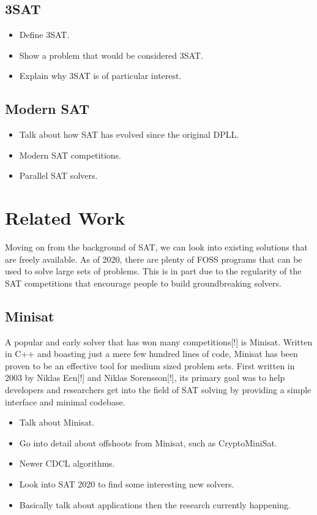 \documentclass{article}
\begin{document}
\subsection{3SAT}
\begin{itemize}
    \item Define 3SAT.
    \item Show a problem that would be considered 3SAT.
    \item Explain why 3SAT is of particular interest.
\end{itemize}

\subsection{Modern SAT}
\begin{itemize}
    \item Talk about how SAT has evolved since the original DPLL.
    \item Modern SAT competitions.
    \item Parallel SAT solvers.
\end{itemize}

\section{Related Work}
Moving on from the background of SAT, we can look into existing solutions that are freely available.
As of 2020, there are plenty of FOSS programs that can be used to solve large sets of problems. This
is in part due to the regularity of the SAT competitions that encourage people to build
groundbreaking solvers.

\subsection{Minisat}
A popular and early solver that has won many competitions[!] is Minisat. Written in C++ and boasting
just a mere few hundred lines of code, Minisat has been proven to be an effective tool for medium
sized problem sets. First written in 2003 by Niklas Een[!] and Niklas Sorensson[!], its primary goal
was to help developers and researchers get into the field of SAT solving by providing a simple
interface and minimal codebase.

\begin{itemize}
    \item Talk about Minisat.
    \item Go into detail about offshoots from Minisat, such as CryptoMiniSat.
    \item Newer CDCL algorithms.
    \item Look into SAT 2020 to find some interesting new solvers.
    \item Basically talk about applications then the research currently happening.
\end{itemize}
\end{document}
